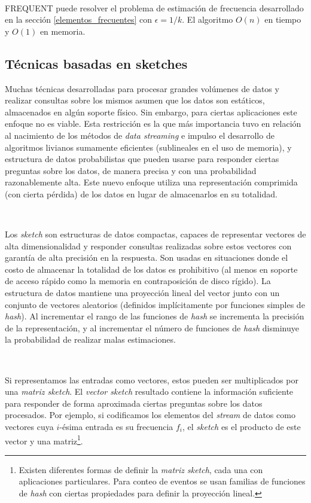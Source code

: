 \documentclass[a4paper,12pt, oneside]{article}
\begin{document}
\

FREQUENT puede resolver el problema de estimación de frecuencia desarrollado en la sección \ref{elementos_frecuentes} con $\epsilon = 1/k$. El algoritmo $O(n)$ en tiempo y $O(1)$ en memoria.

\subsection{Técnicas basadas en sketches}\label{sec:tecnicas_basadas_en_sketches}

Muchas técnicas desarrolladas para procesar grandes volúmenes de datos y realizar consultas sobre los mismos asumen que los datos son estáticos, almacenados en algún soporte físico. Sin embargo, para ciertas aplicaciones este enfoque no es viable. Esta restricción es la que más importancia tuvo en relación al nacimiento de los métodos de \textit{data streaming} e impulso el desarrollo de algoritmos livianos sumamente eficientes (sublineales en el uso de memoria), y estructura de datos probabilistas que pueden usarse para responder ciertas preguntas sobre los datos, de manera precisa y con una probabilidad razonablemente alta. Este nuevo enfoque utiliza una representación comprimida (con cierta pérdida) de los datos en lugar de almacenarlos en su totalidad.

\

Los \textit{sketch} son estructuras de datos compactas, capaces de representar vectores de alta dimensionalidad y responder consultas realizadas sobre estos vectores con garantía de alta precisión en la respuesta\cite{Cormode:2005:IDS:1073713.1073718}. Son usadas en situaciones donde el costo de almacenar la totalidad de los datos es prohibitivo (al menos en soporte de acceso rápido como la memoria en contraposición de disco rígido). La estructura de datos mantiene una proyección lineal del vector junto con un conjunto de vectores aleatorios (definidos implícitamente por funciones simples de \textit{hash}). Al incrementar el rango de las funciones de \textit{hash} se incrementa la precisión de la representación, y al incrementar el número de funciones de \textit{hash} disminuye la probabilidad de realizar malas estimaciones.

\

Si representamos las entradas como vectores, estos pueden ser multiplicados por una \textit{matriz sketch}. El \textit{vector sketch} resultado contiene la  información suficiente para responder de forma aproximada ciertas preguntas sobre los datos procesados. Por ejemplo, si codificamos los elementos del \textit{stream} de datos como vectores cuya $i$-ésima entrada es su frecuencia $f_i$, el \textit{sketch} es el producto de este vector y una matriz\footnote{Existen diferentes formas de definir la \textit{matriz sketch}, cada una con aplicaciones particulares. Para conteo de eventos se usan familias de funciones de \textit{hash} con ciertas propiedades para definir la proyección lineal.}.
\end{document}
